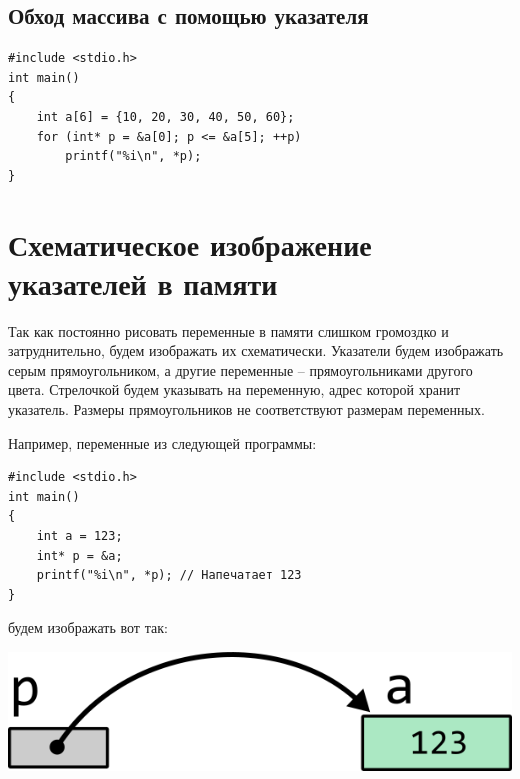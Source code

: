 \documentclass[10pt]{article}
\begin{document}
\subsection*{Обход массива с помощью указателя}
\begin{lstlisting}
#include <stdio.h>
int main() 
{
    int a[6] = {10, 20, 30, 40, 50, 60};
    for (int* p = &a[0]; p <= &a[5]; ++p) 
        printf("%i\n", *p);
}
\end{lstlisting}



\newpage

\section*{Схематическое изображение указателей в памяти}
Так как постоянно рисовать переменные в памяти слишком громоздко и затруднительно, будем изображать их схематически. Указатели будем изображать серым прямоугольником, а другие переменные -- прямоугольниками другого цвета. Стрелочкой будем указывать на переменную, адрес которой хранит указатель. Размеры прямоугольников не соответствуют размерам переменных.

Например, переменные из следующей программы:

\begin{lstlisting}
#include <stdio.h>
int main() 
{
    int a = 123;
    int* p = &a;
    printf("%i\n", *p); // Напечатает 123
}
\end{lstlisting}

будем изображать вот так:

\begin{center}
\includegraphics[scale=1]{../images/memory_3_pointer_to_int_b_scheme.png}
\end{center}
\end{document}
